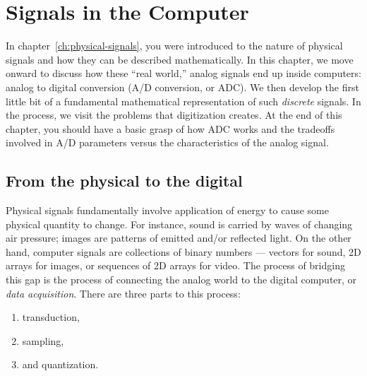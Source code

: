 
%
%
%
%
%
%
%
%

\chapter{Signals in the Computer}
\label{ch:computer-signals}

In chapter~\ref{ch:physical-signals}, you were introduced to the
nature of physical signals and how they can be described
mathematically.  In this chapter, we move onward to discuss how these
``real world,'' analog signals end up inside computers: analog to
digital conversion (A/D conversion, or ADC). We then develop the first
little bit of a fundamental mathematical representation of such
\emph{discrete} signals. In the process, we visit the problems that
digitization creates. At the end of this chapter, you should have a
basic grasp of how ADC works and the tradeoffs involved in A/D
parameters versus the characteristics of the analog signal.

\section{From the physical to the digital}

Physical signals fundamentally involve application of energy to cause
some physical quantity to change. For instance, sound is carried by
waves of changing air pressure; images are patterns of emitted and/or
reflected light. On the other hand, computer signals are collections
of binary numbers --- vectors for sound, 2D arrays for images, or
sequences of 2D arrays for video. The process of bridging this gap is
the process of connecting the analog world to the digital
computer, or \emph{data acquisition}. There are three parts to this
process:
\begin{enumerate}
\item transduction,
\item sampling,
\item and quantization.
\end{enumerate}

